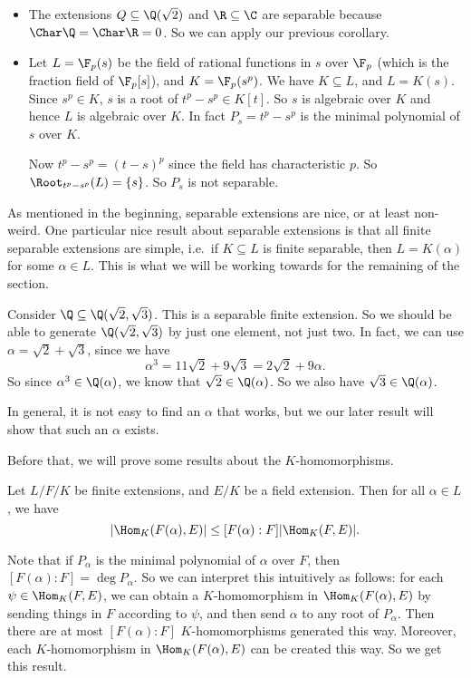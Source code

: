 \documentclass[a4paper]{article}
\begin{document}
\begin{eg}\leavevmode
  \begin{itemize}
    \item The extensions $Q \subseteq \Q(\sqrt{2})$ and $\R \subseteq \C$ are separable because $\Char \Q = \Char \R = 0$. So we can apply our previous corollary.
    \item Let $L = \F_p(s)$ be the field of rational functions in $s$ over $\F_p$ (which is the fraction field of $\F_p[s]$), and $K = \F_p(s^p)$. We have $K \subseteq L$, and $L = K(s)$. Since $s^p \in K$, $s$ is a root of $t^p - s^p \in K[t]$. So $s$ is algebraic over $K$ and hence $L$ is algebraic over $K$. In fact $P_s = t^p - s^p$ is the minimal polynomial of $s$ over $K$.

      Now $t^p - s^p = (t - s)^p$ since the field has characteristic $p$. So $\Root_{t^p - s^p}(L) = \{s\}$. So $P_s$ is not separable.
  \end{itemize}
\end{eg}
As mentioned in the beginning, separable extensions are nice, or at least non-weird. One particular nice result about separable extensions is that all finite separable extensions are simple, i.e.\ if $K \subseteq L$ is finite separable, then $L = K(\alpha)$ for some $\alpha \in L$. This is what we will be working towards for the remaining of the section.

\begin{eg}
  Consider $\Q \subseteq \Q(\sqrt{2}, \sqrt{3})$. This is a separable finite extension. So we should be able to generate $\Q(\sqrt{2}, \sqrt{3})$ by just one element, not just two. In fact, we can use $\alpha = \sqrt{2} + \sqrt{3}$, since we have
  \[
    \alpha^3 = 11\sqrt{2} + 9\sqrt{3} = 2\sqrt{2} + 9 \alpha.
  \]
  So since $\alpha^3 \in \Q(\alpha)$, we know that $\sqrt{2} \in \Q(\alpha)$. So we also have $\sqrt{3} \in \Q(\alpha)$.
\end{eg}
In general, it is not easy to find an $\alpha$ that works, but we our later result will show that such an $\alpha$ exists.

Before that, we will prove some results about the $K$-homomorphisms.
\begin{lemma}
  Let $L/F/K$ be finite extensions, and $E/K$ be a field extension. Then for all $\alpha \in L$, we have
  \[
    |\Hom_K(F(\alpha), E)| \leq [F(\alpha): F] |\Hom_K(F, E)|.
  \]
\end{lemma}
Note that if $P_\alpha$ is the minimal polynomial of $\alpha$ over $F$, then $[F(\alpha): F] = \deg P_\alpha$. So we can interpret this intuitively as follows: for each $\psi \in \Hom_K(F, E)$, we can obtain a $K$-homomorphism in $\Hom_K(F(\alpha), E)$ by sending things in $F$ according to $\psi$, and then send $\alpha$ to any root of $P_\alpha$. Then there are at most $[F(\alpha): F]$ $K$-homomorphisms generated this way. Moreover, each $K$-homomorphism in $\Hom_K(F(\alpha), E)$ can be created this way. So we get this result.
\end{document}
